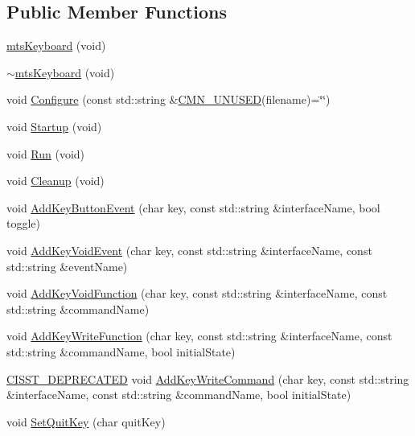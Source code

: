 \subsection*{Public Member Functions}
\begin{DoxyCompactItemize}
\item 
\hyperlink{classmts_keyboard_adcca3e0e99ed2012ada15359d71c9ccf}{mts\+Keyboard} (void)
\item 
\hyperlink{classmts_keyboard_aa2c02ebc887246bf460f1ae17f631558}{$\sim$mts\+Keyboard} (void)
\item 
void \hyperlink{classmts_keyboard_a386a495b739b6a14475c8009c5b63c09}{Configure} (const std\+::string \&\hyperlink{cmn_portability_8h_a021894e2626935fa2305434b1e893ff6}{C\+M\+N\+\_\+\+U\+N\+U\+S\+E\+D}(filename)=\char`\"{}\char`\"{})
\item 
void \hyperlink{classmts_keyboard_a64d7db5165ea2bdd37a422e36eab63cc}{Startup} (void)
\item 
void \hyperlink{classmts_keyboard_ad185c6674e74f5a8a644de354a161cdc}{Run} (void)
\item 
void \hyperlink{classmts_keyboard_a4ae8a0f75d1bf5e641c777373084503f}{Cleanup} (void)
\item 
void \hyperlink{classmts_keyboard_ae5c798cb3f57bdb381e92569c75fdacb}{Add\+Key\+Button\+Event} (char key, const std\+::string \&interface\+Name, bool toggle)
\item 
void \hyperlink{classmts_keyboard_aca2d3dfd032bd898e3d2c96a0662e844}{Add\+Key\+Void\+Event} (char key, const std\+::string \&interface\+Name, const std\+::string \&event\+Name)
\item 
void \hyperlink{classmts_keyboard_ab09848eb354518b5da1ec359c2d7f1c2}{Add\+Key\+Void\+Function} (char key, const std\+::string \&interface\+Name, const std\+::string \&command\+Name)
\item 
void \hyperlink{classmts_keyboard_a4e1820cdb79e96540da19ceb9471a55a}{Add\+Key\+Write\+Function} (char key, const std\+::string \&interface\+Name, const std\+::string \&command\+Name, bool initial\+State)
\item 
\hyperlink{cmn_portability_8h_a63da7164735f9501be651b1f2bbc0121}{C\+I\+S\+S\+T\+\_\+\+D\+E\+P\+R\+E\+C\+A\+T\+E\+D} void \hyperlink{classmts_keyboard_aa515148174d1ee6795f3a9fd16f5cec0}{Add\+Key\+Write\+Command} (char key, const std\+::string \&interface\+Name, const std\+::string \&command\+Name, bool initial\+State)
\item 
void \hyperlink{classmts_keyboard_a9755aad63e2916c5cb7f2c53fc8c1ad2}{Set\+Quit\+Key} (char quit\+Key)
\end{DoxyCompactItemize}
